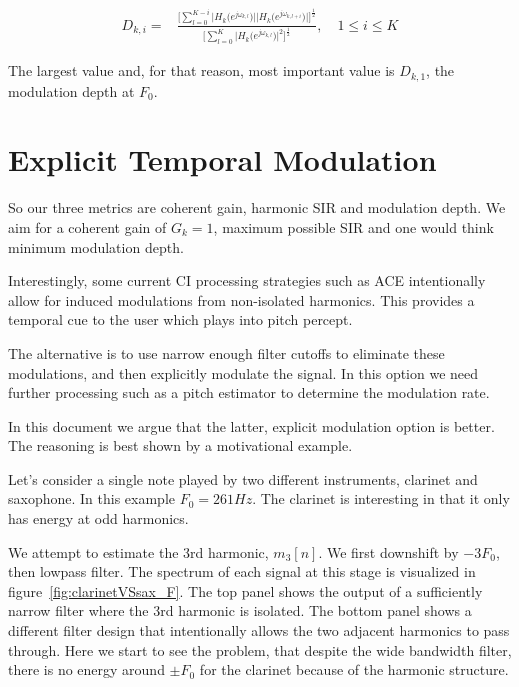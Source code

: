 \documentclass [11pt, proquest] {uwthesis}[2015/03/03]
\begin{document}
\begin{align}
D_{k,i} =& \frac{\Bigg[ \sum\limits_{l=0}^{K-i} \Big|H_k\big(e^{j\omega_{k,l}}\big)\Big| \Big|H_k\big(e^{j\omega_{k,l+i}}\big)\Big|\Bigg]^\frac{1}{2}}
{\Bigg[ \sum\limits_{l=0}^K \Big|H_k\big(e^{j\omega_{k,l}}\big)\Big|^2 \Bigg] ^ \frac{1}{2}}, \quad 1 \leq i \leq K
\end{align}

The largest value and, for that reason, most important value is $D_{k,1}$, the modulation depth at $F_0$.

\section{Explicit Temporal Modulation}

So our three metrics are coherent gain, harmonic SIR and modulation depth.  We aim for a coherent gain of $G_k = 1$, maximum possible SIR and one would think minimum modulation depth.

Interestingly, some current CI processing strategies such as ACE intentionally allow for induced modulations from non-isolated harmonics.  This provides a temporal cue to the user which plays into pitch percept.

The alternative is to use narrow enough filter cutoffs to eliminate these modulations, and then explicitly modulate the signal.  In this option we need further processing such as a pitch estimator to determine the modulation rate.

In this document we argue that the latter, explicit modulation option is better.  The reasoning is best shown by a motivational example.

Let's consider a single note played by two different instruments, clarinet and saxophone.  In this example $F_0 = 261Hz$.  The clarinet is interesting in that it only has energy at odd harmonics.

We attempt to estimate the 3rd harmonic, $m_3[n]$.  We first downshift by $-3F_0$, then lowpass filter.  The spectrum of each signal at this stage is visualized in figure~\ref{fig:clarinetVSsax_F}.  The top panel shows the output of a sufficiently narrow filter where the 3rd harmonic is isolated.  The bottom panel shows a different filter design that intentionally allows the two adjacent harmonics to pass through.  Here we start to see the problem, that despite the wide bandwidth filter, there is no energy around $\pm F_0$ for the clarinet because of the harmonic structure.
\end{document}
